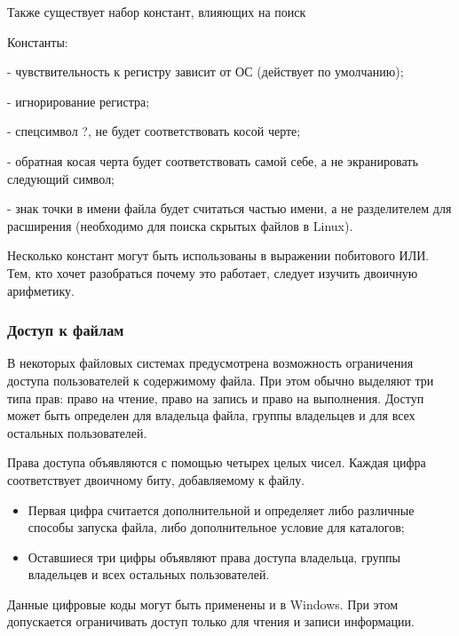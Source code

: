 Также существует набор констант, влияющих на поиск
\begin{keylist}{Константы:}
  
   - чувствительность к регистру зависит от ОС (действует по умолчанию);
  
   - игнорирование регистра; 
  
   - спецсимвол ?, не будет соответствовать косой черте; 
  
   - обратная косая черта будет соответствовать самой себе, а не экранировать следующий символ; 
  
   - знак точки в имени файла будет считаться частью имени, а не разделителем для расширения (необходимо для поиска скрытых файлов в Linux).
\end{keylist}

Несколько констант могут быть использованы в выражении побитового ИЛИ. Тем, кто хочет разобраться почему это работает, следует изучить двоичную арифметику.

\subsubsection*{Доступ к файлам}

В некоторых файловых системах предусмотрена возможность ограничения доступа пользователей к содержимому файла. При этом обычно выделяют три типа прав: право на чтение, право на запись и право на выполнения. Доступ может быть определен для владельца файла, группы владельцев и для всех остальных пользователей.

Права доступа объявляются с помощью четырех целых чисел. Каждая цифра соответствует двоичному биту, добавляемому к файлу. 
\begin{itemize}
  \item Первая цифра считается дополнительной и определяет либо различные способы запуска файла, либо дополнительное условие для каталогов;  
  \item Оставшиеся три цифры объявляют права доступа владельца, группы владельцев и всех остальных пользователей. 
\end{itemize}

Данные цифровые коды могут быть применены и в Windows. При этом допускается ограничивать доступ только для чтения и записи информации.

